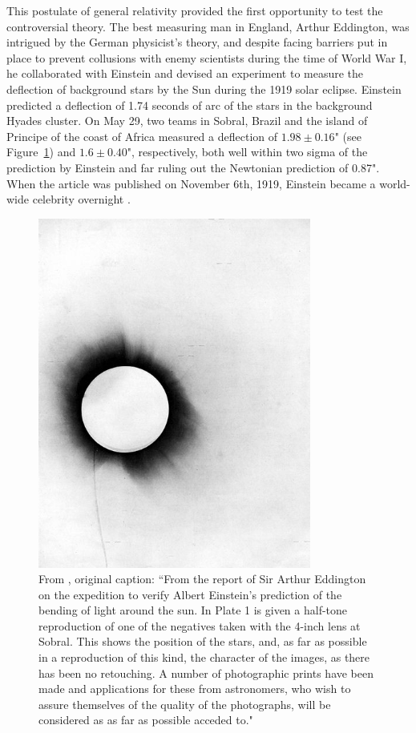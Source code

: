 This postulate of general relativity provided the first opportunity to test the controversial theory. The best measuring man in England, Arthur Eddington, was intrigued by the German physicist's theory, and despite facing barriers put in place to prevent collusions with enemy scientists during the time of World War I, he collaborated with Einstein and devised an experiment to measure the deflection of background stars by the Sun during the 1919 solar eclipse. Einstein predicted a deflection of 1.74 seconds of arc of the stars in the background Hyades cluster. On May 29, two teams in Sobral, Brazil and the island of Principe of the coast of Africa measured a deflection of $1.98\pm0.16$" (see Figure~\ref{intro:fig:eclipse}) and $1.6\pm0.40$", respectively, both well within two sigma of the prediction by Einstein and far ruling out the Newtonian prediction of 0.87". When the article was published on November 6th, 1919, Einstein became a world-wide celebrity overnight \citep{Dyson:1920zl}.

\begin{figure}
\centering
\includegraphics[width=0.8\textwidth]{Intro/1919_eclipse_negative.jpg}
\caption[Photometric plates from the 1919 solar eclipse]{From \citet{Dyson:1920zl}, original caption: ``From the report of Sir Arthur Eddington on the expedition to verify Albert Einstein's prediction of the bending of light around the sun. In Plate 1 is given a half-tone reproduction of one of the negatives taken with the 4-inch lens at Sobral. This shows the position of the stars, and, as far as possible in a reproduction of this kind, the character of the images, as there has been no retouching. A number of photographic prints have been made and applications for these from astronomers, who wish to assure themselves of the quality of the photographs, will be considered as as far as possible acceded to."}
\label{intro:fig:eclipse}
\end{figure}

